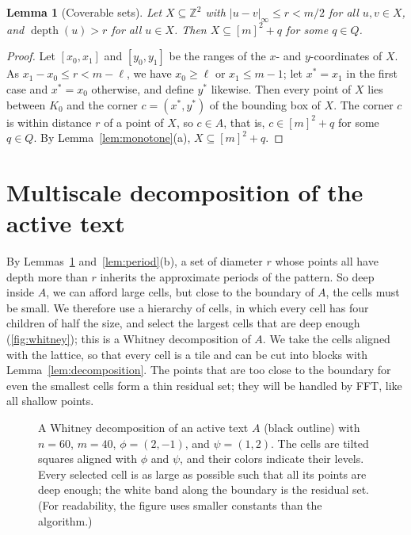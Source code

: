 \documentclass[11pt]{article}
\newtheorem{lemma}[theorem]{Lemma}
\theoremstyle{definition}
\newcommand{\Z}{\mathbb{Z}}
\DeclareMathOperator{\depth}{depth}
\newcommand{\inorm}[1]{\lvert #1 \rvert_\infty}
\begin{document}
\begin{lemma}[Coverable sets]\label{lem:coverable}
Let $X \subseteq \Z^2$ with $\inorm{u-v} \le r < m/2$ for all $u, v \in X$, and $\depth(u) > r$ for all $u \in X$.
Then $X \subseteq [m]^2 + q$ for some $q \in Q$.
\end{lemma}
\begin{proof}
Let $[x_0, x_1]$ and $[y_0, y_1]$ be the ranges of the $x$- and $y$-coordinates of $X$.
As $x_1 - x_0 \le r < m - \ell$, we have $x_0 \ge \ell$ or $x_1 \le m - 1$; let $x^\ast = x_1$ in the first case and $x^\ast = x_0$ otherwise, and define $y^\ast$ likewise.
Then every point of $X$ lies between $K_0$ and the corner $c = (x^\ast, y^\ast)$ of the bounding box of $X$.
The corner $c$ is within distance $r$ of a point of $X$, so $c \in A$, that is, $c \in [m]^2 + q$ for some $q \in Q$.
By Lemma~\ref{lem:monotone}(a), $X \subseteq [m]^2 + q$.
\end{proof}



\section{Multiscale decomposition of the active text}
\label{sec:multiscale}

By Lemmas~\ref{lem:coverable} and~\ref{lem:period}(b), a set of diameter $r$ whose points all have depth more than $r$ inherits the approximate periods of the pattern.
So deep inside $A$, we can afford large cells, but close to the boundary of $A$, the cells must be small.
We therefore use a hierarchy of cells, in which every cell has four children of half the size, and select the largest cells that are deep enough (\autoref{fig:whitney}); this is a Whitney decomposition of $A$.
We take the cells aligned with the lattice, so that every cell is a tile and can be cut into blocks with Lemma~\ref{lem:decomposition}.
The points that are too close to the boundary for even the smallest cells form a thin residual set; they will be handled by FFT, like all shallow points.

\begin{figure}[t]
  \centering
  \caption{A Whitney decomposition of an active text $A$ (black outline) with $n = 60$, $m = 40$, $\phi = (2,-1)$, and $\psi = (1,2)$.
    The cells are tilted squares aligned with $\phi$ and $\psi$, and their colors indicate their levels.
    Every selected cell is as large as possible such that all its points are deep enough; the white band along the boundary is the residual set.
    (For readability, the figure uses smaller constants than the algorithm.)}
  \label{fig:whitney}
\end{figure}
\end{document}

